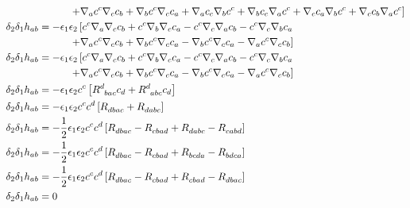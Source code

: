 \begin{align*}
    &\quad\quad\quad\left.+\nabla_{a}c^c\nabla_cc_{b}+\nabla_{b}c^c\nabla_cc_{a}+\nabla_{a}c_{c}\nabla_bc^c+\nabla_{b}c_{c}\nabla_ac^c+\nabla_{c}c_{a}\nabla_bc^c+\nabla_{c}c_{b}\nabla_ac^c\right]\\
    \delta_2\delta_1 h_{ab}&=-\epsilon_1\epsilon_2\left[c^c\nabla_{a}\nabla_cc_{b}+c^c\nabla_{b}\nabla_cc_{a}-c^c\nabla_c\nabla_{a}c_{b}-c^c\nabla_c\nabla_{b}c_{a}\right.\\
    &\quad\quad\quad\left.+\nabla_{a}c^c\nabla_cc_{b}+\nabla_{b}c^c\nabla_cc_{a}-\nabla_bc^c\nabla_{c}c_{a}-\nabla_ac^c\nabla_{c}c_{b}\right]\\
    \delta_2\delta_1 h_{ab}&=-\epsilon_1\epsilon_2\left[c^c\nabla_{a}\nabla_cc_{b}+c^c\nabla_{b}\nabla_cc_{a}-c^c\nabla_c\nabla_{a}c_{b}-c^c\nabla_c\nabla_{b}c_{a}\right.\\
    &\quad\quad\quad\left.+\nabla_{a}c^c\nabla_cc_{b}+\nabla_{b}c^c\nabla_cc_{a}-\nabla_bc^c\nabla_{c}c_{a}-\nabla_ac^c\nabla_{c}c_{b}\right]\\
    \delta_2\delta_1 h_{ab}&=-\epsilon_1\epsilon_2c^c\left[\tensor{R}{^d_b_a_c}c_{d}+\tensor{R}{^d_a_b_c}c_{d}\right]\\
    \delta_2\delta_1 h_{ab}&=-\epsilon_1\epsilon_2c^cc^d\left[\tensor{R}{_d_b_a_c}+\tensor{R}{_d_a_b_c}\right]\\
    \delta_2\delta_1 h_{ab}&=-\frac12\epsilon_1\epsilon_2c^cc^d\left[\tensor{R}{_d_b_a_c}-\tensor{R}{_c_b_a_d}+\tensor{R}{_d_a_b_c}-\tensor{R}{_c_a_b_d}\right]\\
    \delta_2\delta_1 h_{ab}&=-\frac12\epsilon_1\epsilon_2c^cc^d\left[\tensor{R}{_d_b_a_c}-\tensor{R}{_c_b_a_d}+\tensor{R}{_b_c_d_a}-\tensor{R}{_b_d_c_a}\right]\\
    \delta_2\delta_1 h_{ab}&=-\frac12\epsilon_1\epsilon_2c^cc^d\left[\tensor{R}{_d_b_a_c}-\tensor{R}{_c_b_a_d}+\tensor{R}{_c_b_a_d}-\tensor{R}{_d_b_a_c}\right]\\
    \delta_2\delta_1 h_{ab}&=0
\end{align*}